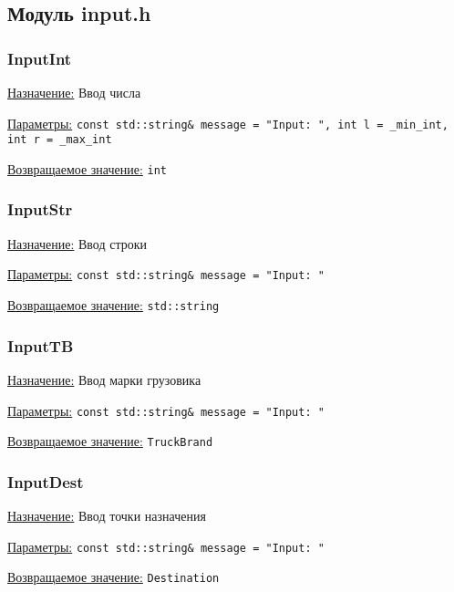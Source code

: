\subsection{Модуль input.h}


\subsubsection{InputInt}

\underline{Назначение:} Ввод числа

\underline{Параметры:} \verb|const std::string& message = "Input: ", int l = _min_int, int r = _max_int|

\underline{Возвращаемое значение:} \verb|int|


\subsubsection{InputStr} 

\underline{Назначение:} Ввод строки

\underline{Параметры:} \verb|const std::string& message = "Input: "|

\underline{Возвращаемое значение:} \verb|std::string|


\subsubsection{InputTB}

\underline{Назначение:} Ввод марки грузовика

\underline{Параметры:} \verb|const std::string& message = "Input: "|

\underline{Возвращаемое значение:} \verb|TruckBrand|


\subsubsection{InputDest}

\underline{Назначение:} Ввод точки назначения

\underline{Параметры:} \verb|const std::string& message = "Input: "|

\underline{Возвращаемое значение:} \verb|Destination|


